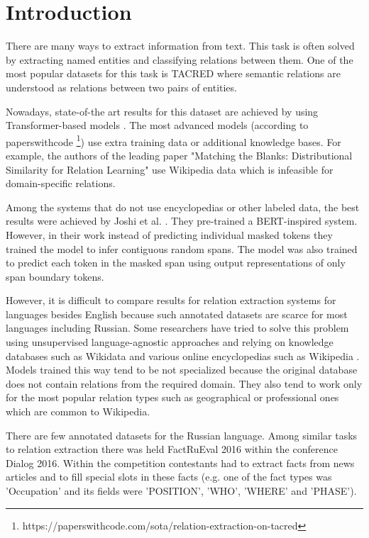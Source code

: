\documentclass{dialogue}
\begin{document}

\section{Introduction}
There are many ways to extract information from text. This task is often solved by extracting named entities and classifying relations between them. One of the most popular datasets for this task is TACRED \cite{tacred} where semantic relations are understood as relations between two pairs of entities.

Nowadays, state-of-the art results for this dataset are achieved by using Transformer-based models \cite{attention}. The most advanced models (according to paperswithcode \footnote{https://paperswithcode.com/sota/relation-extraction-on-tacred}) use extra training data or additional knowledge bases. For example, the authors of the leading paper "Matching the Blanks: Distributional Similarity for Relation Learning" \cite{BaldiniSoares2019} use Wikipedia data which is infeasible for domain-specific relations.

Among the systems that do not use encyclopedias or other labeled data, the best results were achieved by Joshi et al. \cite{spanbert}. They pre-trained a BERT-inspired system. However, in their work instead of predicting individual masked tokens they trained the model to infer contiguous random  spans. The model was also trained to predict each token in the masked span using output representations of only span boundary tokens.

However, it is difficult to compare results for relation extraction systems for languages besides English because such annotated datasets are scarce for most languages including Russian. Some researchers have tried to solve this problem using unsupervised language-agnostic approaches and relying on knowledge databases such as Wikidata and various online encyclopedias such as Wikipedia \cite{Heist2017}. Models trained this way tend to be not specialized because the original database does not contain relations from the required domain. They also tend to work only for the most popular relation types such as geographical or professional ones which are common to Wikipedia.

There are few annotated datasets for the Russian language. Among similar tasks to relation extraction there was held FactRuEval 2016 within the conference Dialog 2016. Within the competition contestants had to extract facts from news articles and to fill special slots in these facts (e.g. one of the fact types was 'Occupation' and its fields were 'POSITION', 'WHO', 'WHERE' and 'PHASE').
\end{document}
